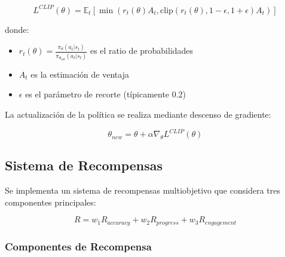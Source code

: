 \begin{equation}
	\label{eq:ppo-objective}
	L^{CLIP}(\theta) = \mathbb{E}_t[\min(r_t(\theta)A_t, \text{clip}(r_t(\theta), 1-\epsilon, 1+\epsilon)A_t)]
\end{equation}

donde:
\begin{itemize}
	\item $r_t(\theta) = \frac{\pi_\theta(a_t|s_t)}{\pi_{\theta_{old}}(a_t|s_t)}$ es el ratio de probabilidades
	\item $A_t$ es la estimación de ventaja
	\item $\epsilon$ es el parámetro de recorte (típicamente 0.2)
\end{itemize}

La actualización de la política se realiza mediante descenso de gradiente:

\begin{equation}
	\theta_{new} = \theta + \alpha \nabla_\theta L^{CLIP}(\theta)
\end{equation}

\subsection{Sistema de Recompensas}
\label{sistema-recompensas}

Se implementa un sistema de recompensas multiobjetivo que considera tres componentes principales:

\begin{equation}
	\label{eq:reward}
	R = w_1R_{accuracy} + w_2R_{progress} + w_3R_{engagement}
\end{equation}

\subsubsection{Componentes de Recompensa}

